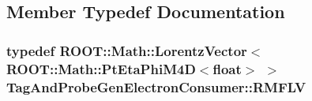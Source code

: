 \subsection{Member Typedef Documentation}
\hypertarget{classTagAndProbeGenElectronConsumer_a31a7636bd49180cf32b5e99eceb05609}{
\subsubsection[{RMFLV}]{\setlength{\rightskip}{0pt plus 5cm}typedef ROOT::Math::LorentzVector$<$ROOT::Math::PtEtaPhiM4D$<$float$>$ $>$ {\bf TagAndProbeGenElectronConsumer::RMFLV}}}
\label{classTagAndProbeGenElectronConsumer_a31a7636bd49180cf32b5e99eceb05609}


